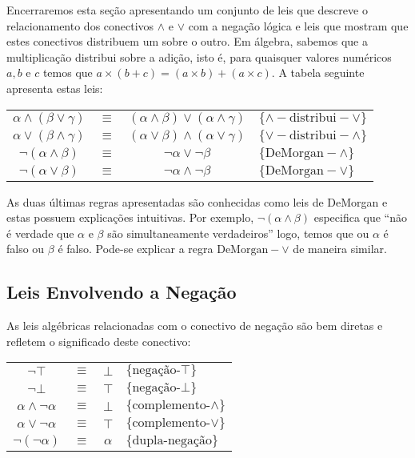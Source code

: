 Encerraremos esta seção apresentando um conjunto de leis que descreve
o relacionamento dos conectivos $\land$ e $\lor$ com a negação lógica
e leis que mostram que estes conectivos distribuem um sobre o outro.
Em álgebra, sabemos que a multiplicação distribui sobre a adição, isto
é, para quaisquer valores numéricos $a,b$ e $c$ temos que $a \times (b
+ c) = (a\times b) + (a\times c)$. A tabela seguinte apresenta estas
leis:

\begin{table}[h]
  \begin{tabular}{|cccl|}
    \hline
      $\alpha\land (\beta \lor \gamma)$ & $\equiv$ & $(\alpha \land
      \beta)\lor(\alpha \land \gamma)$ &
      $\{\land-\text{distribui}-\lor\}$\\
        $\alpha\lor (\beta \land \gamma)$ & $\equiv$ & $(\alpha \lor
      \beta)\land(\alpha \lor \gamma)$ & $\{\lor-\text{distribui}-\land\}$\\
      $\neg (\alpha\land \beta)$ & $\equiv$ & $\neg \alpha \lor \neg \beta$ &
      $\{\text{DeMorgan}-\land\}$\\
      $\neg (\alpha\lor \beta)$ & $\equiv$ & $\neg \alpha \land \neg \beta$ &
      $\{\text{DeMorgan}-\lor\}$\\
      \hline
  \end{tabular}
  \centering
\end{table}

As duas últimas regras apresentadas são conhecidas como leis de
DeMorgan e estas possuem explicações intuitivas. Por exemplo,
$\neg (\alpha \land \beta)$ especifica que ``não é verdade que
$\alpha$ e $\beta$ são simultaneamente verdadeiros'' logo, temos que
ou $\alpha$ é falso ou $\beta$ é falso. Pode-se explicar a regra
$\text{DeMorgan}-\lor$ de maneira similar.

\subsection{Leis Envolvendo a Negação}

As leis algébricas relacionadas com o conectivo de negação são bem
diretas e refletem o significado deste conectivo:

\begin{table}[h]
  \begin{tabular}{|cccl|}
    \hline
    $\neg \top$ & $\equiv$ & $\bot$ & $\{\text{negação-}\top\}$\\
    $\neg \bot$ & $\equiv$ & $\top$ & $\{\text{negação-}\bot\}$\\
    $\alpha\land\neg\alpha$ & $\equiv$ & $\bot$ &
    $\{\text{complemento-}\land\}$\\
    $\alpha\lor\neg\alpha$ & $\equiv$ & $\top$ &
    $\{\text{complemento-}\lor\}$\\
    $\neg(\neg\alpha)$ & $\equiv$ & $\alpha$ & $\{\text{dupla-negação}\}$\\
    \hline
  \end{tabular}
  \centering
\end{table}

